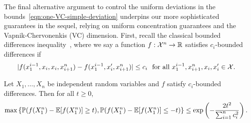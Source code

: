 \documentclass[11pt]{article}
\begin{document}
The final alternative argument to control the uniform deviations
in the bounds~\eqref{eqn:one-VC-simple-deviation} underpins
our more sophisticated guarantees in the sequel,
relying on uniform concentration guarantees and the
Vapnik-Chervonenkis (VC) dimension.
%
First, recall the classical bounded differences
inequality~\cite{McDiarmid89, Wainwright19}, where we say a function $f :
\mathcal{X}^n \to \mathbb{R}$ satisfies $c_i$-bounded differences if
\begin{equation*}
  |f(x_1^{i-1}, x_i, x_i, x_{i + 1}^n)
  - f(x_1^{i-1}, x_i', x_{i+1}^n)|
  \le c_i
  ~~ \mbox{for~all~} x_1^{i-1}, x_{i+1}^n,
  x_i, x_i' \in \mathcal{X}.
\end{equation*}
\begin{lemma}
  \label{lemma:bounded-differences}
  Let $X_1, \ldots, X_n$ be independent random variables
  and $f$ satisfy $c_i$-bounded differences. Then
  for all $t \ge 0$,
  \begin{equation*}
    \max\left\{
    \mathbb{P}(f(X_1^n) - \mathbb{E}[f(X_1^n)] \ge t),
    \mathbb{P}(f(X_1^n) - \mathbb{E}[f(X_1^n)] \le -t)
    \right\}
    \le \exp\left(-\frac{2 t^2}{\sum_{i = 1}^n c_i^2}\right).
  \end{equation*}
\end{lemma}
\end{document}
